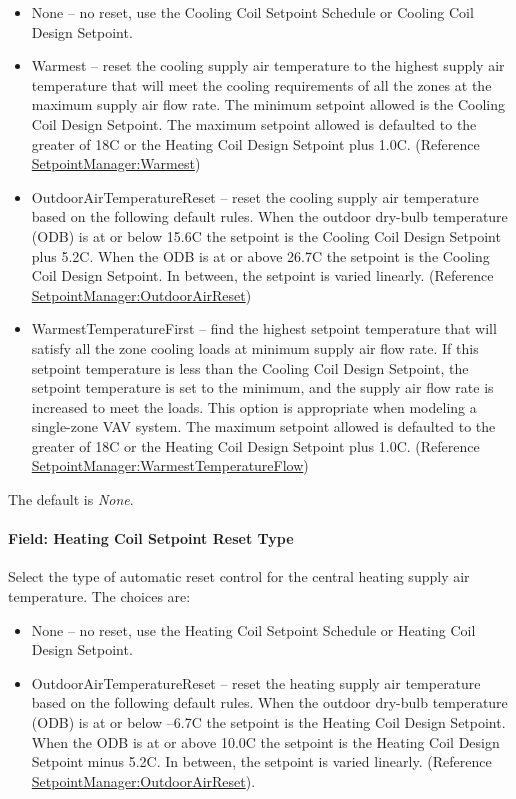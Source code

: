 \begin{itemize}
\item
  None -- no reset, use the Cooling Coil Setpoint Schedule or Cooling Coil Design Setpoint.
\item
  Warmest -- reset the cooling supply air temperature to the highest supply air temperature that will meet the cooling requirements of all the zones at the maximum supply air flow rate. The minimum setpoint allowed is the Cooling Coil Design Setpoint. The maximum setpoint allowed is defaulted to the greater of 18C or the Heating Coil Design Setpoint plus 1.0C. (Reference \hyperref[setpointmanagerwarmest]{SetpointManager:Warmest})
\item
  OutdoorAirTemperatureReset -- reset the cooling supply air temperature based on the following default rules. When the outdoor dry-bulb temperature (ODB) is at or below 15.6C the setpoint is the Cooling Coil Design Setpoint plus 5.2C. When the ODB is at or above 26.7C the setpoint is the Cooling Coil Design Setpoint. In between, the setpoint is varied linearly. (Reference \hyperref[setpointmanageroutdoorairreset]{SetpointManager:OutdoorAirReset})
\item
  WarmestTemperatureFirst -- find the highest setpoint temperature that will satisfy all the zone cooling loads at minimum supply air flow rate. If this setpoint temperature is less than the Cooling Coil Design Setpoint, the setpoint temperature is set to the minimum, and the supply air flow rate is increased to meet the loads. This option is appropriate when modeling a single-zone VAV system. The maximum setpoint allowed is defaulted to the greater of 18C or the Heating Coil Design Setpoint plus 1.0C. (Reference \hyperref[setpointmanagerwarmesttemperatureflow]{SetpointManager:WarmestTemperatureFlow})
\end{itemize}

The default is \emph{None}.

\paragraph{Field: Heating Coil Setpoint Reset Type}\label{field-heating-coil-setpoint-reset-type-1}

Select the type of automatic reset control for the central heating supply air temperature. The choices are:

\begin{itemize}
\item
  None -- no reset, use the Heating Coil Setpoint Schedule or Heating Coil Design Setpoint.
\item
  OutdoorAirTemperatureReset -- reset the heating supply air temperature based on the following default rules. When the outdoor dry-bulb temperature (ODB) is at or below --6.7C the setpoint is the Heating Coil Design Setpoint. When the ODB is at or above 10.0C the setpoint is the Heating Coil Design Setpoint minus 5.2C. In between, the setpoint is varied linearly. (Reference \hyperref[setpointmanageroutdoorairreset]{SetpointManager:OutdoorAirReset}).
\end{itemize}

